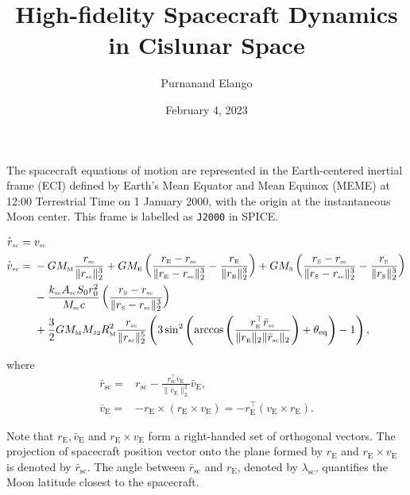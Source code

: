 \documentclass[12pt,letterpaper]{article}
\title{High-fidelity Spacecraft Dynamics in Cislunar Space}
\author{Purnanand Elango}
\date{February 4, 2023}
\renewcommand{\dot}[1]{\overset{\text{{\large .}}}{#1}}
\newcommand{\rsc}{r_{\scriptscriptstyle\text{sc}}}
\newcommand{\lamsc}{\lambda_{\scriptscriptstyle\text{sc}}}
\newcommand{\vsc}{v_{\scriptscriptstyle\text{sc}}}
\newcommand{\brsc}{\bar{r}_{\scriptscriptstyle\text{sc}}}
\newcommand{\drsc}{\dot{r}_{\scriptscriptstyle\text{sc}}}
\newcommand{\dvsc}{\dot{v}_{\scriptscriptstyle\text{sc}}}
\newcommand{\rE}{r_{\scriptscriptstyle\text{E}}}
\newcommand{\rS}{r_{\scriptscriptstyle \text{S}}}
\newcommand{\vE}{v_{\scriptscriptstyle \text{E}}}
\newcommand{\bvE}{\bar{v}_{\scriptscriptstyle \text{E}}}
\newcommand{\ME}{M_{\scriptscriptstyle \text{E}}}
\newcommand{\MM}{M_{\scriptscriptstyle \text{M}}}
\newcommand{\MS}{M_{\scriptscriptstyle \text{S}}}
\newcommand{\RM}{R_{\scriptscriptstyle \text{M}}}
\newcommand{\MJtwo}{M_{\scriptscriptstyle \text{J2}}}
\newcommand{\thteq}{\theta_{\text{eq}}}
\newcommand{\ksc}{k_{\scriptscriptstyle\text{sc}}}
\newcommand{\Msc}{M_{\scriptscriptstyle\text{sc}}}
\newcommand{\Asc}{A_{\scriptscriptstyle\text{sc}}}
\begin{document}
\maketitle

The spacecraft equations of motion are represented in the Earth-centered inertial frame (ECI) defined by Earth's Mean Equator and Mean Equinox (MEME) at 12:00 Terrestrial Time on 1 January 2000, with the origin at the instantaneous Moon center. This frame is labelled as \texttt{J2000} in SPICE.

\begin{subequations}
\begin{align}
    \drsc ={} &\vsc\\
    \dvsc ={} & \displaystyle-G\MM \frac{\rsc}{\|\rsc\|_2^3} + G\ME\left( \frac{\rE - \rsc}{\| \rE - \rsc \|_2^3} - \frac{\rE}{\|\rE\|_2^3}\right) + G\MS\left( \frac{\rS - \rsc}{\| \rS - \rsc \|_2^3} - \frac{\rS}{\|\rS\|_2^3}\right) \nonumber \\
     & - \frac{\ksc\Asc S_0r_0^2}{\Msc c} \left( \frac{\rS - \rsc}{\| \rS - \rsc \|_2^3} \right)\\
     & + \frac{3}{2}G\MM\MJtwo\RM^2\frac{\rsc}{\|\rsc\|_2^5}\left( 3\sin^2 \left( \arccos\left(\frac{\rE^\top \brsc}{\|\rE\|_2\|\brsc\|_2}\right)+\thteq\right) - 1 \right),\nonumber
\end{align}    
\end{subequations}

where 
\begin{align}
    \brsc ={} & \rsc - \displaystyle \frac{\rsc^\top\bvE}{\|\bvE\|^2_2}\bvE,\\
    \bvE ={} & - \rE \times (\rE\times\vE)  = -\rE^\top(\vE\times\rE).  
\end{align}

Note that $\rE,\bvE$ and $\rE\times\vE$ form a right-handed set of orthogonal vectors. The projection of spacecraft position vector onto the plane formed by $\rE$ and $\rE\times\vE$ is denoted by $\brsc$. The angle between $\brsc$ and $\rE$, denoted by $\lamsc$, quantifies the Moon latitude closest to the spacecraft. 


\end{document}
